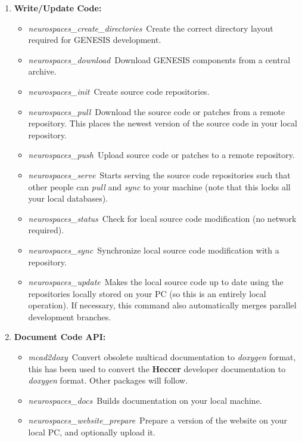 \documentclass[12pt]{article}
\begin{document}
\begin{enumerate}
   \item {\bf Write/Update Code:}
   \begin{itemize}
      \item {\it neurospaces\_create\_directories}\,\,\,Create the correct directory layout required for GENESIS development.
      \item {\it neurospaces\_download}\,\,\,Download GENESIS components from a central archive.
      \item {\it neurospaces\_init}\,\,\,Create source code repositories.
      \item {\it neurospaces\_pull}\,\,\,Download the source code or patches from a remote repository. This places the newest version of the source 
      code in your local repository.
      \item {\it neurospaces\_push}\,\,\,Upload source code or patches to a remote repository.
      \item {\it neurospaces\_serve}\,\,\,Starts serving the source code repositories such that other people can {\it pull} and {\it sync} to your machine (note that this locks all your local databases).
      \item {\it neurospaces\_status}\,\,\,Check for local source code modification (no network required).
      \item {\it neurospaces\_sync}\,\,\,Synchronize local source code modification with a repository.
      \item {\it neurospaces\_update}\,\,\,Makes the local source code up to date using the repositories locally stored on your PC (so this is an entirely local operation). If necessary, this command also automatically merges parallel development branches.
   \end{itemize}
  
   \item{\bf Document Code API:}
   \begin{itemize}
      \item {\it mcad2doxy}\,\,\,Convert obsolete multicad documentation to {\it doxygen} format, this has been used to convert the {\bf Heccer} 
      developer documentation to {\it doxygen} format. Other packages will follow.
      \item {\it neurospaces\_docs}\,\,\,Builds documentation on your local machine.
      \item {\it neurospaces\_website\_prepare}\,\,\,Prepare a version of the website on your local PC, and optionally upload it. 
   \end{itemize}
  

\end{enumerate}
\end{document}
